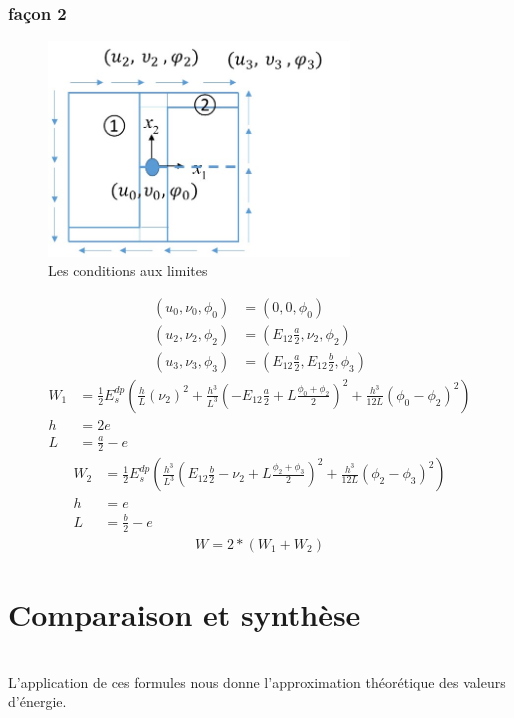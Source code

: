 \documentclass{article}
\begin{document}
\subsubsection{façon 2}
\begin{figure}[H]
    \begin{center}
    \includegraphics[width=8cm]{img/cisaillement2.jpg}
    \end{center}
    \caption{Les conditions aux limites}
    \label{fig_cisaillement}
\end{figure}
\par
\begin{align*}
    (u_{0},\nu_{0},\phi_{0})&=(0,0,\phi_0)\\
    (u_{2},\nu_{2},\phi_{2})&=(E_{12}\frac{a}{2},\nu_{2},\phi_2)\\
    (u_{3},\nu_{3},\phi_{3})&=(E_{12}\frac{a}{2},E_{12}\frac{b}{2},\phi_3)
\end{align*}
\begin{align*}
    W_{1}&=\frac12 E_s^{dp} \left(\frac{h}{L}(\nu_2)^2+
        \frac{h^3}{L^3}\left( - E_{12}\frac{a}{2} +
        L\frac{\phi_0+\phi_2}{2} \right)^2 + \frac{h^3}{12L}(\phi_0-\phi_2)^2 \right)\\
    h&=2e\\
    L&=\frac{a}{2}-e
\end{align*}
\begin{align*}
    W_{2}&=\frac12 E_s^{dp} \left(
        \frac{h^3}{L^3}\left( E_{12}\frac{b}{2}-\nu_2 +
        L\frac{\phi_2+\phi_3}{2} \right)^2 + \frac{h^3}{12L}(\phi_2-\phi_3)^2 \right)\\
    h&=e\\
    L&=\frac{b}{2}-e
\end{align*}
\begin{align*}
    W=2*(W_{1}+W_{2})
\end{align*}

\par

\section{Comparaison et synthèse}\leavevmode \\
L'application de ces formules nous donne l'approximation théorétique des valeurs d'énergie.
\end{document}
